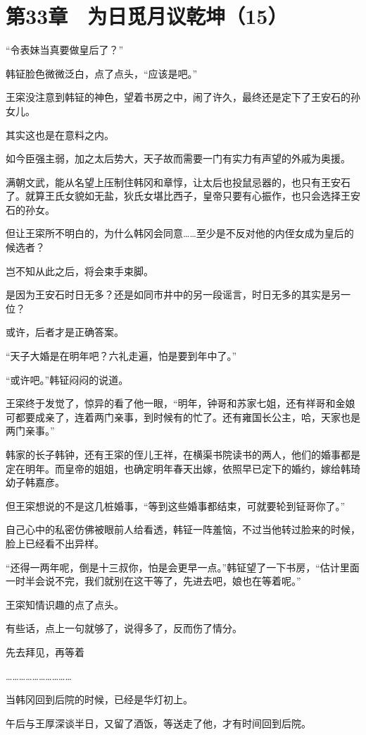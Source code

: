 \section{第33章　为日觅月议乾坤（15）}

“令表妹当真要做皇后了？”

韩钲脸色微微泛白，点了点头，“应该是吧。”

王寀没注意到韩钲的神色，望着书房之中，闹了许久，最终还是定下了王安石的孙女儿。

其实这也是在意料之内。

如今臣强主弱，加之太后势大，天子故而需要一门有实力有声望的外戚为奥援。

满朝文武，能从名望上压制住韩冈和章惇，让太后也投鼠忌器的，也只有王安石了。就算王氏女貌如无盐，狄氏女堪比西子，皇帝只要有心振作，也只会选择王安石的孙女。

但让王寀所不明白的，为什么韩冈会同意……至少是不反对他的内侄女成为皇后的候选者？

岂不知从此之后，将会束手束脚。

是因为王安石时日无多？还是如同市井中的另一段谣言，时日无多的其实是另一位？

或许，后者才是正确答案。

“天子大婚是在明年吧？六礼走遍，怕是要到年中了。”

“或许吧。”韩钲闷闷的说道。

王寀终于发觉了，惊异的看了他一眼，“明年，钟哥和苏家七姐，还有祥哥和金娘可都要成亲了，连着两门亲事，到时候有的忙了。还有雍国长公主，哈，天家也是两门亲事。”

韩家的长子韩钟，还有王寀的侄儿王祥，在横渠书院读书的两人，他们的婚事都是定在明年。而皇帝的姐姐，也确定明年春天出嫁，依照早已定下的婚约，嫁给韩琦幼子韩嘉彦。

但王寀想说的不是这几桩婚事，“等到这些婚事都结束，可就要轮到钲哥你了。”

自己心中的私密仿佛被眼前人给看透，韩钲一阵羞恼，不过当他转过脸来的时候，脸上已经看不出异样。

“还得一两年呢，倒是十三叔你，怕是会更早一点。”韩钲望了一下书房，“估计里面一时半会说不完，我们就别在这干等了，先进去吧，娘也在等着呢。”

王寀知情识趣的点了点头。

有些话，点上一句就够了，说得多了，反而伤了情分。

先去拜见，再等着

…………………………

当韩冈回到后院的时候，已经是华灯初上。

午后与王厚深谈半日，又留了酒饭，等送走了他，才有时间回到后院。


